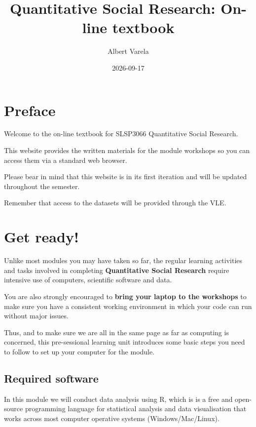 \documentclass[
  letterpaper,
  DIV=11,
  numbers=noendperiod]{scrreprt}
\title{Quantitative Social Research: On-line textbook}
\author{Albert Varela}
\date{2026-09-17}
\renewcommand*\contentsname{Table of contents}
\newcommand\contentsname{Table of contents}
\begin{document}
\maketitle

\renewcommand*\contentsname{Table of contents}
{
\setcounter{tocdepth}{2}
\tableofcontents
}


\chapter*{Preface}\label{preface}


Welcome to the on-line textbook for SLSP3066 Quantitative Social
Research.

This website provides the written materials for the module workshops so
you can access them via a standard web browser.

Please bear in mind that this website is in its first iteration and will
be updated throughout the semester.

Remember that access to the datasets will be provided through the VLE.


\chapter{Get ready!}\label{get-ready}

Unlike most modules you may have taken so far, the regular learning
activities and tasks involved in completing \textbf{Quantitative Social
Research} require intensive use of computers, scientific software and
data.

You are also strongly encouraged to \textbf{bring your laptop to the
workshops} to make sure you have a consistent working environment in
which your code can run without major issues.

Thus, and to make sure we are all in the same page as far as computing
is concerned, this pre-sessional learning unit introduces some basic
steps you need to follow to set up your computer for the module.

\section{Required software}\label{required-software}

In this module we will conduct data analysis using R, which is is a free
and open-source programming language for statistical analysis and data
visualisation that works across most computer operative systems
(Windows/Mac/Linux).
\end{document}
